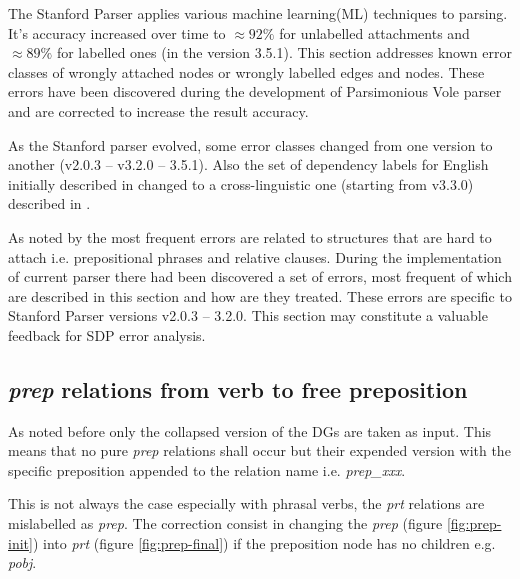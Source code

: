 The Stanford Parser applies various machine learning(ML) techniques to parsing. It's accuracy increased over time to $\approx92\%$ for unlabelled attachments and $\approx89\%$ for labelled ones (in the version 3.5.1). This section addresses known error classes of wrongly attached nodes or wrongly labelled edges and nodes. These errors have been discovered during the development of Parsimonious Vole parser and are corrected to increase the result accuracy. 

As the Stanford parser evolved, some error classes changed from one version to another (v2.0.3 -- v3.2.0 -- 3.5.1). Also the set of dependency labels for English initially described in \citep{Marneffe2008, Marneffe2008a} changed to a cross-linguistic one (starting from v3.3.0) described in \citep{Marneffe2014}.

As noted by \citet{Cer2010a} the most frequent errors are related to structures that are hard to attach i.e. prepositional phrases and relative clauses. During the implementation of current parser there had been discovered a set of errors, most frequent of which are described in this section and how are they treated. These errors are specific to Stanford Parser versions v2.0.3 -- 3.2.0. This section may constitute a valuable feedback for SDP error analysis. 

\subsection{\textit{prep} relations from verb to free preposition}
As noted before only the collapsed version of the DGs are taken as input. This means that no pure \textit{prep} relations shall occur but their expended version with the specific preposition appended to the relation name i.e. \textit{prep\_xxx}.

This is not always the case especially with phrasal verbs, the \textit{prt} relations are mislabelled as \textit{prep}. The correction consist in changing the \textit{prep} (figure \ref{fig:prep-init}) into \textit{prt} (figure \ref{fig:prep-final}) if the preposition node has no children e.g. \textit{pobj}. 

